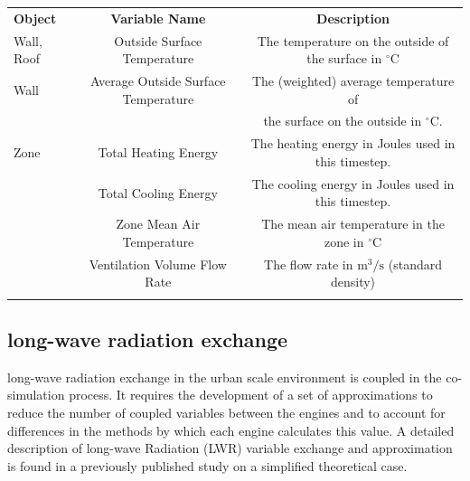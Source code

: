 \documentclass{tBPS2e}
\theoremstyle{plain}
\theoremstyle{definition}
\theoremstyle{remark}
\begin{document}
\begin{table}[H]
{\begin{tabular}[l]{@{}lcc}\toprule
  \bf{Object} &  \bf{Variable Name} & \bf{Description} \\
\colrule
Wall, Roof & Outside Surface Temperature & The temperature on the outside of the surface in $^{\circ}\mathrm{C}$ \\    
    \hline
Wall & Average Outside Surface Temperature & The (weighted) average temperature of \\
& & the surface on the outside in $^{\circ}\mathrm{C}$. \\
    \hline
Zone & Total Heating Energy & The heating energy in Joules used in this timestep. \\
& Total Cooling Energy & The cooling energy in Joules used in this timestep. \\
& Zone Mean Air Temperature & The mean air temperature in the zone in $^{\circ}\mathrm{C}$ \\
& Ventilation Volume Flow Rate & The flow rate in $\mathrm{m}^3/\mathrm{s}$ (standard density) \\
\botrule
\end{tabular}}
\label{FMUexports}
\end{table}

\subsection{long-wave radiation exchange}
\label{lwradiation}
long-wave radiation exchange in the urban scale environment is coupled in the
co-simulation process. It requires the development of a set of
approximations to reduce the number of coupled variables between the engines
and to account for differences in the methods by which each engine calculates
this value. A detailed description of long-wave Radiation (LWR) variable
exchange and approximation is found in a previously published study
\citep{miller_long_2015} on a simplified theoretical case.
\end{document}
